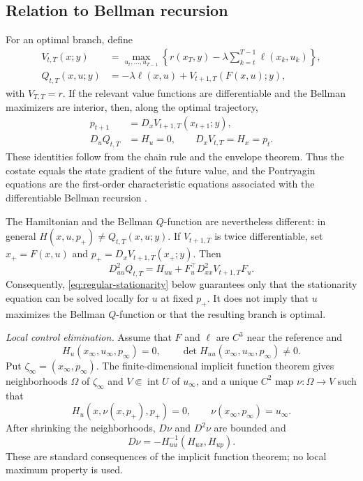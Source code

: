 \documentclass[twocolumn,nameyear,amsthm]{autart}
\newcommand{\Fbar}{F}
\newcommand{\xinf}{x_\infty}
\newcommand{\uinf}{u_\infty}
\newcommand{\pinf}{p_\infty}
\numberwithin{equation}{section}
\begin{document}
\subsection{Relation to Bellman recursion}\label{sec:bellman}
For an optimal branch, define
\begin{align*}
 V_{t,T}(x;y)&=\max_{u_t,\ldots,u_{T-1}}
 \left\{r(x_T,y)-\lambda\sum_{k=t}^{T-1}\ell(x_k,u_k)\right\},\\
 Q_{t,T}(x,u;y)&=-\lambda\ell(x,u)
 +V_{t+1,T}(\Fbar(x,u);y),
\end{align*}
with $V_{T,T}=r$.  If the relevant value functions are differentiable and
the Bellman maximizers are interior, then, along the optimal trajectory,
\begin{equation}\label{eq:bellman-pmp}
 \begin{aligned}
 p_{t+1}&=D_xV_{t+1,T}(x_{t+1};y),\\
 D_uQ_{t,T}&=H_u=0,\qquad D_xV_{t,T}=H_x=p_t .
 \end{aligned}
\end{equation}
These identities follow from the chain rule and the envelope theorem.  Thus
the costate equals the state gradient of the future value, and the Pontryagin
equations are the first-order characteristic equations associated with the
differentiable Bellman recursion
\citep{bertsekas2017dynamic,sassano2025infinite}.

The Hamiltonian and the Bellman $Q$-function are nevertheless different: in
general $H(x,u,p_+)\ne Q_{t,T}(x,u;y)$.  If $V_{t+1,T}$ is twice differentiable,
set $x_+=\Fbar(x,u)$ and $p_+=D_xV_{t+1,T}(x_+;y)$.  Then
\begin{equation}\label{eq:bellman-hessian}
 D_{uu}^2Q_{t,T}=H_{uu}
 +\Fbar_u^\top D_{xx}^2V_{t+1,T}\Fbar_u .
\end{equation}
Consequently, \eqref{eq:regular-stationarity} below guarantees only that the
stationarity equation can be solved locally for $u$ at fixed $p_+$.  It does
not imply that $u$ maximizes the Bellman $Q$-function or that the resulting
branch is optimal.

\medskip\noindent\textit{Local control elimination.}
Assume that $\Fbar$ and $\ell$ are $C^3$ near the reference and
\begin{equation}\label{eq:regular-stationarity}
 H_u(\xinf,\uinf,\pinf)=0,\qquad
 \det H_{uu}(\xinf,\uinf,\pinf)\ne0 .
\end{equation}
Put $\zeta_\infty=(\xinf,\pinf)$.  The finite-dimensional implicit function
theorem gives neighborhoods $\Omega$ of $\zeta_\infty$ and
$V\Subset\operatorname{int}U$ of $\uinf$,
and a unique $C^2$ map $\nu:\Omega\to V$ such that
\begin{equation}\label{eq:legendre-graph}
 H_u(x,\nu(x,p_+),p_+)=0,\qquad
 \nu(\xinf,\pinf)=\uinf .
\end{equation}
After shrinking the neighborhoods, $D\nu$ and $D^2\nu$ are bounded and
\begin{equation}\label{eq:nu-derivative}
 D\nu=-H_{uu}^{-1}(H_{ux},H_{up}) .
\end{equation}
These are standard consequences of the implicit function theorem; no local
maximum property is used.
\end{document}
